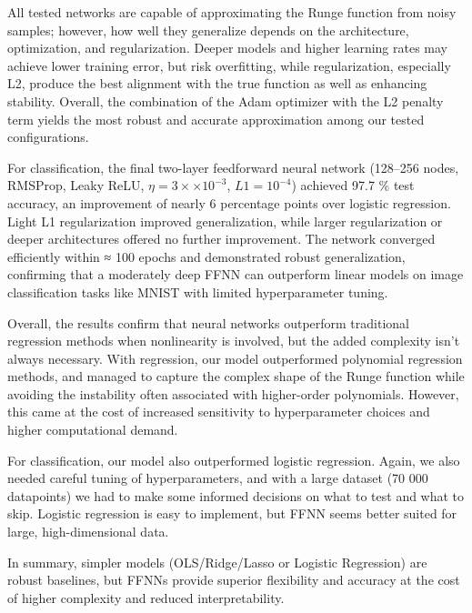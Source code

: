 \documentclass[amssymb,twocolumn,aps,floatfix]{revtex4-2}
\begin{document}
All tested networks are capable of approximating the Runge function from noisy samples; however, how well they generalize depends on the architecture, optimization, and regularization. Deeper models and higher learning rates may achieve lower training error, but risk overfitting, while regularization, especially L2, produce the best alignment with the true function as well as enhancing stability. Overall, the combination of the Adam optimizer with the L2 penalty term yields the most robust and accurate approximation among our tested configurations. 

For classification, the final two-layer feedforward neural network (128–256 nodes, RMSProp, Leaky ReLU, $\eta = 3 ×\times 10^{-3}$, $L1 = 10^{-4}$) achieved 97.7 \% test accuracy, an improvement of nearly 6 percentage points over logistic regression. Light L1 regularization improved generalization, while larger regularization or deeper architectures offered no further improvement. The network converged efficiently within ≈ 100 epochs and demonstrated robust generalization, confirming that a moderately deep FFNN can outperform linear models on image classification tasks like MNIST with limited hyperparameter tuning.

Overall, the results confirm that neural networks outperform traditional regression methods when nonlinearity is involved, but the added complexity isn't always necessary. With regression, our model outperformed polynomial regression methods, and managed to capture the complex shape of the Runge function while avoiding the instability often associated with higher-order polynomials. However, this came at the cost of increased sensitivity to hyperparameter choices and higher computational demand.

For classification, our model also outperformed logistic regression. Again, we also needed careful tuning of hyperparameters, and with a large dataset (70 000 datapoints) we had to make some informed decisions on what to test and what to skip. Logistic regression is easy to implement, but FFNN seems better suited for large, high-dimensional data. 

In summary, simpler models (OLS/Ridge/Lasso or Logistic Regression) are robust baselines, but FFNNs provide superior flexibility and accuracy at the cost of higher complexity and reduced interpretability.



\end{document}
